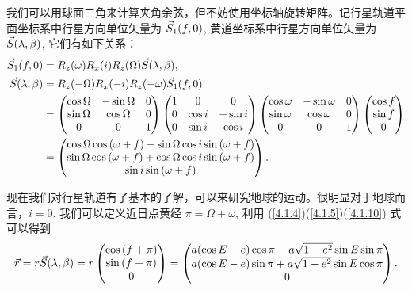 \documentclass[UTF8, 12pt, a4paper, oneside, onecolumn, fontset=none]{ctexart}
\begin{document}
我们可以用球面三角来计算夹角余弦，但不妨使用坐标轴旋转矩阵。记行星轨道平面坐标系中行星方向单位矢量为 $\vec{S}_{1}\mleft(f, 0\mright)$, 黄道坐标系中行星方向单位矢量为 $\vec{S}\mleft(\lambda,\beta\mright)$, 它们有如下关系：
\begin{align}
\vec{S}_{1}\mleft(f, 0\mright)&=R_{z}\mleft(\omega\mright) R_{x}\mleft(i\mright) R_{z}\mleft(\Omega\mright)\vec{S}\mleft(\lambda,\beta\mright),\\
\vec{S}\mleft(\lambda,\beta\mright)&=R_{z}\mleft(-\Omega\mright) R_{x}\mleft(-i\mright) R_{z}\mleft(-\omega\mright)\vec{S}_{1}\mleft(f, 0\mright)\notag\\
&=\begin{pmatrix}
\cos{\Omega} & -\sin{\Omega} & 0\\
\sin{\Omega} & \cos{\Omega} & 0\\
0 & 0 & 1
\end{pmatrix}
\begin{pmatrix}
1 & 0 & 0\\
0 & \cos{i} & -\sin{i}\\
0 & \sin{i} & \cos{i}
\end{pmatrix}
\begin{pmatrix}
\cos{\omega} & -\sin{\omega} & 0\\
\sin{\omega} & \cos{\omega} & 0\\
0 & 0 & 1
\end{pmatrix}
\begin{pmatrix}
\cos{f}\\
\sin{f}\\
0
\end{pmatrix}\notag\\
&=\begin{pmatrix}
\cos{\Omega}\cos{\mleft(\omega+f\mright)}-\sin{\Omega}\cos{i}\sin{\mleft(\omega+f\mright)}\\
\sin{\Omega}\cos{\mleft(\omega+f\mright)}+\cos{\Omega}\cos{i}\sin{\mleft(\omega+f\mright)}\\
\sin{i}\sin{\mleft(\omega+f\mright)}
\end{pmatrix}.\label{4.1.10}
\end{align}

现在我们对行星轨道有了基本的了解，可以来研究地球的运动。很明显对于地球而言，$i=0$. 我们可以定义近日点黄经 $\pi=\Omega+\omega$, 利用 (\ref{4.1.4})(\ref{4.1.5})(\ref{4.1.10}) 式可以得到
\begin{equation}
\vec{r}=r\vec{S}\mleft(\lambda,\beta\mright)=r\begin{pmatrix}
\cos{\mleft(f+\pi\mright)}\\
\sin{\mleft(f+\pi\mright)}\\
0
\end{pmatrix}=
\begin{pmatrix}
a\mleft(\cos{E}-e\mright)\cos{\pi}-a\sqrt{1-e^{2}}\sin{E}\sin{\pi}\\
a\mleft(\cos{E}-e\mright)\sin{\pi}+a\sqrt{1-e^{2}}\sin{E}\cos{\pi}\\
0
\end{pmatrix}.
\end{equation}
\end{document}
